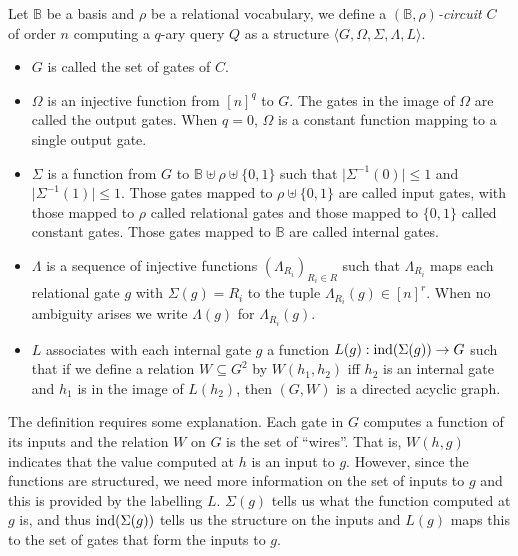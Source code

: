 \documentclass[../paper.tex]{subfiles}
\begin{document}
\begin{definition}
  Let $\mathbb{B}$ be a basis and $\rho$ be a relational vocabulary, we define a
  \emph{$(\mathbb{B}, \rho)$-circuit} $C$ of order $n$ computing a $q$-ary query
  $Q$ as a structure $\langle G, \Omega, \Sigma, \Lambda, L \rangle$.
  \begin{itemize}
    \setlength\itemsep{0mm}
  \item $G$ is called the set of gates of
    $C$.%
  \item $\Omega$ is an injective function from $[n]^q$ to $G$. The gates in the
    image of $\Omega$ are called the output gates. When $q = 0$, $\Omega$ is a
    constant function mapping to a single output gate.
  \item $\Sigma$ is a function from $G$ to $\mathbb{B} \uplus \rho \uplus
    \{0,1\} $ such that $\vert \Sigma^{-1} (0) \vert \leq 1$ and $\vert
    \Sigma^{-1} (1) \vert \leq 1$. Those gates mapped to $\rho \uplus \{0,1\}$
    are called input gates, with those mapped to $\rho$ called relational gates
    and those mapped to $\{0,1\}$ called constant gates. Those gates mapped to
    $\mathbb{B}$ are called internal gates.
  \item $\Lambda$ is a sequence of injective functions $(\Lambda_{R_i})_{R_i \in
      R}$ such that $\Lambda_{R_i}$ maps each relational gate $g$ with $\Sigma
    (g) = R_i$ to the tuple $\Lambda_{R_i} (g) \in [n]^{r}$. When no ambiguity
    arises we write $\Lambda (g)$ for $\Lambda_{R_i} (g)$.
  \item $L$ associates with each internal gate $g$ a function $L(g):
    \text{\upshape ind}(\Sigma(g)) \rightarrow G$ such that if we define a relation $W
    \subseteq G^{2}$ by $W(h_1,h_2)$ iff $h_2$ is an internal gate and $h_1$ is
    in the image of $L(h_2)$, then $(G, W)$ is a directed acyclic graph.
  \end{itemize}
\end{definition}

The definition requires some explanation. Each gate in $G$ computes a function
of its inputs and the relation $W$ on $G$ is the set of ``wires''. That is,
$W(h,g)$ indicates that the value computed at $h$ is an input to $g$. However,
since the functions are structured, we need more information on the set of
inputs to $g$ and this is provided by the labelling $L$. $\Sigma(g)$ tells us
what the function computed at $g$ is, and thus $\text{\upshape ind}(\Sigma(g))$ tells us the
structure on the inputs and $L(g)$ maps this to the set of gates that form the
inputs to $g$.
\end{document}
